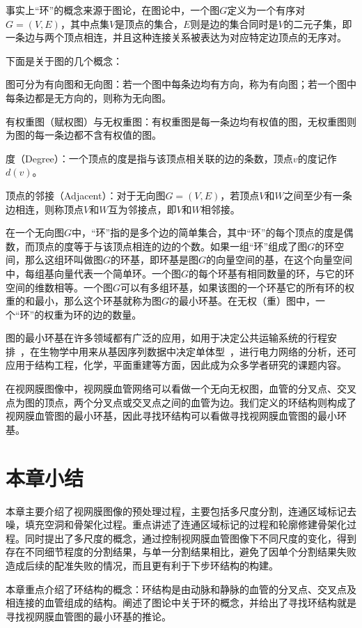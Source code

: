 事实上“环”的概念来源于图论，在图论中，一个图$G$定义为一个有序对$G=(V,E)$，其中点集$V$是顶点的集合，$E$则是边的集合同时是$V$的二元子集，即一条边与两个顶点相连，并且这种连接关系被表达为对应特定边顶点的无序对。

下面是关于图的几个概念：

图可分为有向图和无向图：若一个图中每条边均有方向，称为有向图；若一个图中每条边都是无方向的，则称为无向图。

有权重图（赋权图）与无权重图：有权重图是每一条边均有权值的图，无权重图则为图的每一条边都不含有权值的图。

度（Degree）：一个顶点的度是指与该顶点相关联的边的条数，顶点$v$的度记作$d(v)$。

顶点的邻接（Adjacent）：对于无向图$G=(V,E)$，若顶点$V$和$W$之间至少有一条边相连，则称顶点$V$和$W$互为邻接点，即$V$和$W$相邻接。

在一个无向图$G$中，“环”指的是多个边的简单集合，其中“环”的每个顶点的度是偶数，而顶点的度等于与该顶点相连的边的个数。如果一组“环”组成了图$G$的环空间，那么这组环叫做图$G$的环基，即环基是图$G$的向量空间的基，在这个向量空间中，每组基向量代表一个简单环。一个图$G$的每个环基有相同数量的环，与它的环空间的维数相等。一个图$G$可以有多组环基，如果该图的一个环基它的所有环的权重的和最小，那么这个环基就称为图$G$的最小环基。在无权（重）图中，一个“环”的权重为环的边的数量。

图的最小环基在许多领域都有广泛的应用，如用于决定公共运输系统的行程安排~\cite{lieb}，在生物学中用来从基因序列数据中决定单体型~\cite{derek}，进行电力网络的分析，还可应用于结构工程，化学，平面重建等方面，因此成为众多学者研究的课题内容。

在视网膜图像中，视网膜血管网络可以看做一个无向无权图，血管的分叉点、交叉点为图的顶点，两个分叉点或交叉点之间的血管为边。我们定义的环结构则构成了视网膜血管图的最小环基，因此寻找环结构可以看做寻找视网膜血管图的最小环基。

\section{本章小结}
本章主要介绍了视网膜图像的预处理过程，主要包括多尺度分割，连通区域标记去噪，填充空洞和骨架化过程。重点讲述了连通区域标记的过程和轮廓修建骨架化过程。同时提出了多尺度的概念，通过控制视网膜血管图像下不同尺度的变化，得到存在不同细节程度的分割结果，与单一分割结果相比，避免了因单个分割结果失败造成后续的配准失败的情况，而且更有利于下步环结构的构建。

本章重点介绍了环结构的概念：环结构是由动脉和静脉的血管的分叉点、交叉点及相连接的血管组成的结构。阐述了图论中关于环的概念，并给出了寻找环结构就是寻找视网膜血管图的最小环基的推论。



